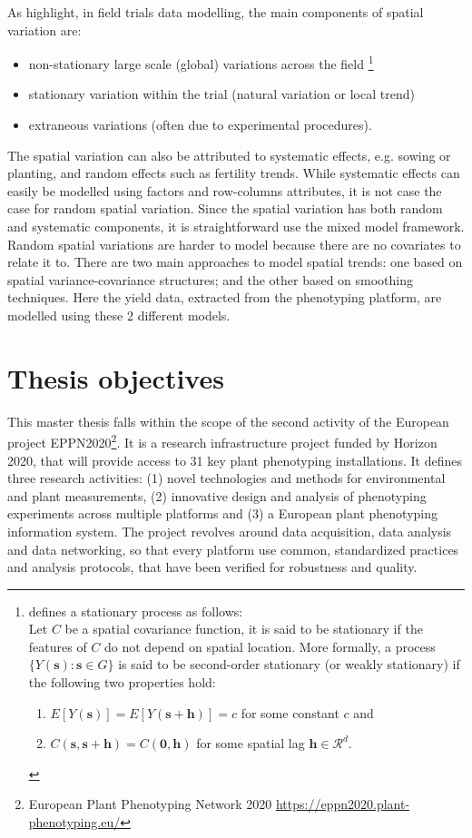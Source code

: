 As \textcite{wilkinson1983nearest} highlight, in field trials data modelling, the main components of spatial variation are:
\begin{itemize}
    \item non-stationary large scale (global) variations across the field
    \footnote{\textcite{risser2016nonstationary} defines a stationary process as follows:\\
    Let $C$ be a spatial covariance function, it is said to be stationary if the features of $C$ do not depend on spatial location. More formally, a process $\{Y(\mathbf{s}) : \mathbf{s} \in G\}$ is said to be second-order stationary (or weakly stationary) if the following two properties hold:
    \begin{enumerate}
        \item $E[Y(\mathbf{s})]=E[Y(\mathbf{s}+\mathbf{h})]=c$ for some constant $c$ and 
        \item $C(\mathbf{s}, \mathbf{s}+\mathbf{h})=C(\mathbf{0}, \mathbf{h})$
        for some spatial lag $\mathbf{h} \in \mathcal{R}^{d}$.
    \end{enumerate}
    }
    \item stationary variation within the trial (natural variation or local trend)
    \item extraneous variations (often due to experimental procedures).
\end{itemize}
The spatial variation can also be attributed to systematic effects, e.g. sowing or planting, and random effects such as fertility trends. While systematic effects can easily be modelled using factors and row-columns attributes, it is not case the case for random spatial variation. Since the spatial variation has both random and systematic components, it is straightforward use the mixed model framework.\\
Random spatial variations are harder to model because there are no covariates to relate it to. There are two main approaches to model spatial trends: one based on spatial variance-covariance structures; and the other based on smoothing techniques. Here the yield data, extracted from the phenotyping platform, are modelled using these 2 different models.
\section{Thesis objectives}
This master thesis falls within the scope of the second activity of the European project EPPN2020\footnote{European Plant Phenotyping Network 2020 \url{https://eppn2020.plant-phenotyping.eu/}}. It is a research infrastructure project funded by  Horizon 2020, that will provide access to 31 key plant phenotyping installations. It defines three research activities: (1) novel technologies and methods for environmental and plant measurements, (2) innovative design and analysis of phenotyping experiments across multiple
platforms and (3) a European plant phenotyping information system. The project revolves around data acquisition, data analysis and data networking, so that every platform use common, standardized practices and analysis protocols, that have been verified for robustness and quality.\\

